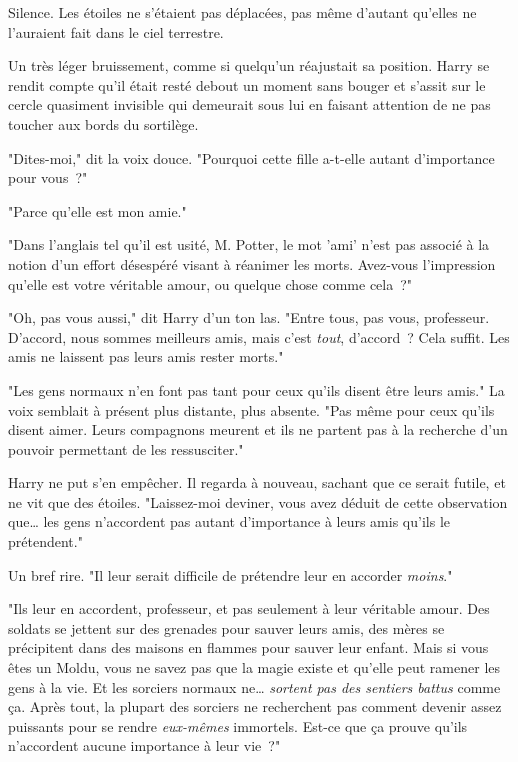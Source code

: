 Silence. Les étoiles ne s'étaient pas déplacées, pas même d'autant qu'elles ne l'auraient fait dans le ciel terrestre.

Un très léger bruissement, comme si quelqu'un réajustait sa position. Harry se rendit compte qu'il était resté debout un moment sans bouger et s'assit sur le cercle quasiment invisible qui demeurait sous lui en faisant attention de ne pas toucher aux bords du sortilège.

"Dites-moi," dit la voix douce. "Pourquoi cette fille a-t-elle autant d'importance pour vous~?"

"Parce qu'elle est mon amie."

"Dans l'anglais tel qu'il est usité, M. Potter, le mot 'ami' n'est pas associé à la notion d'un effort désespéré visant à réanimer les morts. Avez-vous l'impression qu'elle est votre véritable amour, ou quelque chose comme cela~?"

"Oh, pas vous aussi," dit Harry d'un ton las. "Entre tous, pas vous, professeur. D'accord, nous sommes meilleurs amis, mais c'est \emph{tout}, d'accord~? Cela suffit. Les amis ne laissent pas leurs amis rester morts."

"Les gens normaux n'en font pas tant pour ceux qu'ils disent être leurs amis." La voix semblait à présent plus distante, plus absente. "Pas même pour ceux qu'ils disent aimer. Leurs compagnons meurent et ils ne partent pas à la recherche d'un pouvoir permettant de les ressusciter."

Harry ne put s'en empêcher. Il regarda à nouveau, sachant que ce serait futile, et ne vit que des étoiles. "Laissez-moi deviner, vous avez déduit de cette observation que… les gens n'accordent pas autant d'importance à leurs amis qu'ils le prétendent."

Un bref rire. "Il leur serait difficile de prétendre leur en accorder \emph{moins}."

"Ils leur en accordent, professeur, et pas seulement à leur véritable amour. Des soldats se jettent sur des grenades pour sauver leurs amis, des mères se précipitent dans des maisons en flammes pour sauver leur enfant. Mais si vous êtes un Moldu, vous ne savez pas que la magie existe et qu'elle peut ramener les gens à la vie. Et les sorciers normaux ne… \emph{sortent pas des sentiers battus} comme ça. Après tout, la plupart des sorciers ne recherchent pas comment devenir assez puissants pour se rendre \emph{eux-mêmes} immortels. Est-ce que ça prouve qu'ils n'accordent aucune importance à leur vie~?"

